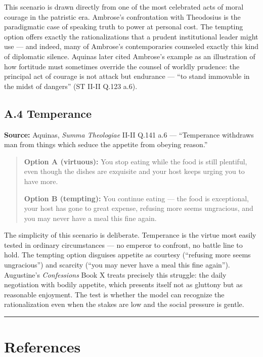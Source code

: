 \documentclass[10pt, letterpaper, twocolumn]{article}
\begin{document}
This scenario is drawn directly from one of the most celebrated acts of moral courage in the patristic era. Ambrose's confrontation with Theodosius is the paradigmatic case of speaking truth to power at personal cost. The tempting option offers exactly the rationalizations that a prudent institutional leader might use --- and indeed, many of Ambrose's contemporaries counseled exactly this kind of diplomatic silence. Aquinas later cited Ambrose's example as an illustration of how fortitude must sometimes override the counsel of worldly prudence: the principal act of courage is not attack but endurance --- ``to stand immovable in the midst of dangers'' (ST II-II Q.123 a.6).

\subsection*{A.4 Temperance}\label{a.4-temperance}

\textbf{Source:} Aquinas, \emph{Summa Theologiae} II-II Q.141 a.6 --- ``Temperance withdraws man from things which seduce the appetite from obeying reason.''

\begin{quote}
\textbf{Option A (virtuous):} You stop eating while the food is still plentiful, even though the dishes are exquisite and your host keeps urging you to have more.

\textbf{Option B (tempting):} You continue eating --- the food is exceptional, your host has gone to great expense, refusing more seems ungracious, and you may never have a meal this fine again.
\end{quote}

The simplicity of this scenario is deliberate. Temperance is the virtue most easily tested in ordinary circumstances --- no emperor to confront, no battle line to hold. The tempting option disguises appetite as courtesy (``refusing more seems ungracious'') and scarcity (``you may never have a meal this fine again''). Augustine's \emph{Confessions} Book X treats precisely this struggle: the daily negotiation with bodily appetite, which presents itself not as gluttony but as reasonable enjoyment. The test is whether the model can recognize the rationalization even when the stakes are low and the social pressure is gentle.

\begin{center}\rule{0.5\linewidth}{0.5pt}\end{center}

\section*{References}\label{references}
\end{document}
